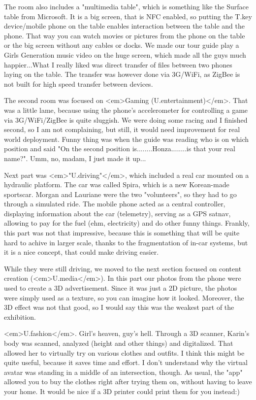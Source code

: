 \begin{post}
\begin{content}
The room also includes a "multimedia table", which is something like the Surface table from Microsoft. It is a big screen, that is NFC enabled, so putting the T.key device/mobile phone on the table enables interaction between the table and the phone. That way you can watch movies or pictures from the phone on the table or the big screen without any cables or docks. We made our tour guide play a Girls Generation music video on the huge screen, which made all the guys much happier...What I really liked was direct transfer of files between two phones laying on the table. The transfer was however done via 3G/WiFi, as ZigBee is not built for high speed transfer between devices.

The second room was focused on <em>Gaming (U.entertainment)</em>. That was a little lame, because using the phone's accelerometer for controlling a game via 3G/WiFi/ZigBee is quite sluggish. We were doing some racing and I finished second, so I am not complaining, but still, it would need improvement for real world deployment. Funny thing was when the guide was reading who is on which position and said "On the second position is........Honza........is that your real name?". Umm, no, madam, I just made it up...

Next part was <em>"U.driving"</em>, which included a real car mounted on a hydraulic platform. The car was called Spira, which is a new Korean-made sportscar. Morgan and Lauriane were the two "volunteers", so they had to go through a simulated ride. The mobile phone acted as a central controller, displaying information about the car (telemetry), serving as a GPS satnav, allowing to pay for the fuel (ehm, electricity) and do other funny things. Frankly, this part was not that impressive, because this is something that will be quite hard to achive in larger scale, thanks to the fragmentation of in-car systems, but it is a nice concept, that could make driving easier.

While they were still driving, we moved to the next section focused on content creation (<em>U.media</em>). In this part our photos from the phone were used to create a 3D advertisement. Since it was just a 2D picture, the photos were simply used as a texture, so you can imagine how it looked. Moreover, the 3D effect was not that good, so I would say this was the weakest part of the exhibition.

<em>U.fashion</em>. Girl's heaven, guy's hell. Through a 3D scanner, Karin's body was scanned, analyzed (height and other things) and digitalized. That allowed her to virtually try on various clothes and outfits. I think this might be quite useful, because it saves time and effort. I don't understand why the virtual avatar was standing in a middle of an intersection, though. As usual, the "app" allowed you to buy the clothes right after trying them on, without having to leave your home. It would be nice if a 3D printer could print them for you instead:)


\end{content}
\end{post}
